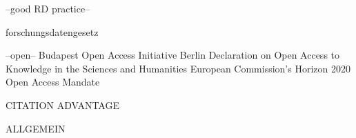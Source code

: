 


--good RD practice--


forschungsdatengesetz 

--open--
Budapest Open Access Initiative
Berlin Declaration on Open Access to Knowledge in the Sciences and Humanities
European Commission's Horizon 2020 Open Access Mandate







CITATION ADVANTAGE \autocite{Bautista-Puig2020}

ALLGEMEIN \autocite{Hopf2022}






\autocite{Martin2013Wissenschaftliche,TenopirEtAl2017,Tröger2016,}



